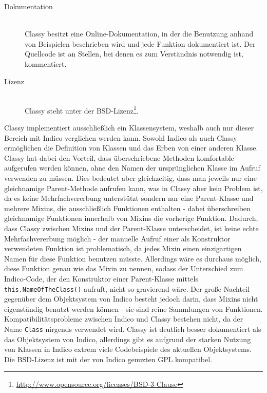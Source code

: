 \begin{description}
\item[Dokumentation] \hfill \\
Classy besitzt eine Online-Dokumentation, in der die Benutzung anhand von Beispielen beschrieben wird
und jede Funktion dokumentiert ist. Der Quellcode ist an Stellen, bei denen es zum Verständnis
notwendig ist, kommentiert.

\item[Lizenz] \hfill \\
Classy steht unter der
BSD-Lizenz\footnote{\href{http://www.opensource.org/licenses/BSD-3-Clause}{http://www.opensource.org/licenses/BSD-3-Clause}}.
\end{description}

Classy implementiert ausschließlich ein Klassensystem, weshalb auch nur dieser Bereich mit Indico
verglichen werden kann. Sowohl Indico als auch Classy ermöglichen die Definition von Klassen und das
Erben von einer anderen Klasse. Classy hat dabei den Vorteil, dass überschriebene Methoden
komfortable aufgerufen werden können, ohne den Namen der ursprünglichen Klasse im Aufruf verwenden
zu müssen. Dies bedeutet aber gleichzeitig, dass man jeweils nur eine gleichnamige Parent-Methode
aufrufen kann, was in Classy aber kein Problem ist, da es keine Mehrfachvererbung unterstützt
sondern nur eine Parent-Klasse und mehrere Mixins, die ausschließlich Funktionen enthalten - dabei
überschreiben gleichnamige Funktionen innerhalb von Mixins die vorherige Funktion. Dadurch, dass
Classy zwischen Mixins und der Parent-Klasse unterscheidet, ist keine echte Mehrfachvererbung
möglich - der manuelle Aufruf einer als Konstruktor verwendeten Funktion ist problematisch, da jedes
Mixin einen einzigartigen Namen für diese Funktion benutzen müsste. Allerdings wäre es durchaus
möglich, diese Funktion genau wie das Mixin zu nennen, sodass der Unterschied zum Indico-Code, der
den Konstruktor einer Parent-Klasse mittels \lstinline{this.NameOfTheClass()} aufruft, nicht
so gravierend wäre. Der große Nachteil gegenüber dem Objektsystem von Indico besteht jedoch darin,
dass Mixins nicht eigenständig benutzt werden können - sie sind reine Sammlungen von Funktionen.
Kompatibilitätsprobleme zwischen Indico und Classy bestehen nicht, da der Name \lstinline{Class}
nirgends verwendet wird. Classy ist deutlich besser dokumentiert als das Objektsystem von Indico,
allerdings gibt es aufgrund der starken Nutzung von Klassen in Indico extrem viele Codebeispiele des
aktuellen Objektsystems. Die BSD-Lizenz ist mit der von Indico genuzten GPL kompatibel.




